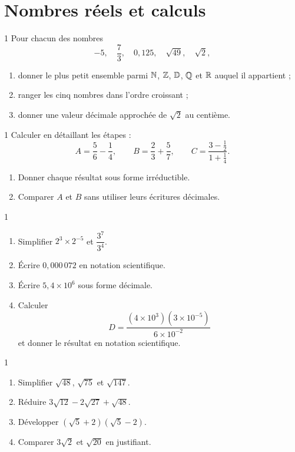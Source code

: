 \section{Nombres réels et calculs}

\begin{exo}{1}
Pour chacun des nombres
\[
 -5,\quad \frac73,\quad 0{,}125,\quad \sqrt{49},\quad \sqrt{2},
\]
\begin{enumerate}
  \item donner le plus petit ensemble parmi $\mathbb{N}$, $\mathbb{Z}$, $\mathbb{D}$, $\mathbb{Q}$ et $\mathbb{R}$
  auquel il appartient ;
  \item ranger les cinq nombres dans l'ordre croissant ;
  \item donner une valeur décimale approchée de $\sqrt2$ au centième.
\end{enumerate}
\end{exo}

\begin{exo}{1}
Calculer en détaillant les étapes :
\[
 A=\frac56-\frac14,\qquad
 B=\frac23+\frac57,\qquad
 C=\frac{3-\frac12}{1+\frac14}.
\]
\begin{enumerate}
  \item Donner chaque résultat sous forme irréductible.
  \item Comparer $A$ et $B$ sans utiliser leurs écritures décimales.
\end{enumerate}
\end{exo}

\begin{exo}{1}
\begin{enumerate}
  \item Simplifier $2^3\times2^{-5}$ et $\dfrac{3^7}{3^4}$.
  \item Écrire $0{,}000\,072$ en notation scientifique.
  \item Écrire $5{,}4\times10^6$ sous forme décimale.
  \item Calculer
  \[
    D=\frac{(4\times10^3)(3\times10^{-5})}{6\times10^{-2}}
  \]
  et donner le résultat en notation scientifique.
\end{enumerate}
\end{exo}

\begin{exo}{1}
\begin{enumerate}
  \item Simplifier $\sqrt{48}$, $\sqrt{75}$ et $\sqrt{147}$.
  \item Réduire $3\sqrt{12}-2\sqrt{27}+\sqrt{48}$.
  \item Développer $(\sqrt5+2)(\sqrt5-2)$.
  \item Comparer $3\sqrt2$ et $\sqrt{20}$ en justifiant.
\end{enumerate}
\end{exo}

